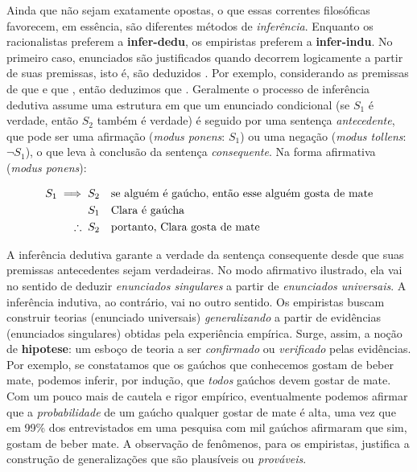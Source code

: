 \documentclass[./main.tex]{subfiles}
\begin{document}
\par Ainda que não sejam exatamente opostas, o que essas correntes filosóficas favorecem, em essência, são diferentes métodos de \textit{inferência}. Enquanto os racionalistas preferem a \textbf{\gls{infer-dedu}}, os empiristas preferem a \textbf{\gls{infer-indu}}. No primeiro caso, enunciados são justificados quando decorrem logicamente a partir de suas premissas, isto é, são deduzidos \cite{laird2010}. Por exemplo, considerando as premissas de que  e que , então deduzimos que . Geralmente o processo de inferência dedutiva assume uma estrutura em que um enunciado condicional (se $S_1$ é verdade, então $S_2$ também é verdade) é seguido por uma sentença \textit{antecedente}, que pode ser uma afirmação (\textit{modus ponens}: $S_1$) ou uma negação (\textit{modus tollens}: $\neg S_1$), o que leva à conclusão da sentença \textit{consequente}. Na forma afirmativa (\textit{modus ponens}):
\begin{linenomath*}
    \begin{align*}
        S_1 \implies S_2 & \quad \textnormal{se alguém é gaúcho, então esse alguém gosta de mate} \\
        S_1 & \quad \textnormal{Clara é gaúcha}\\
        \therefore\;S_2 & \quad \textnormal{portanto, Clara gosta de mate}
    \end{align*}
\end{linenomath*}
A inferência dedutiva garante a verdade da sentença consequente desde que suas premissas antecedentes sejam verdadeiras. No modo afirmativo ilustrado, ela vai no sentido de deduzir \textit{enunciados singulares} a partir de \textit{enunciados universais}. A inferência indutiva, ao contrário, vai no outro sentido. Os empiristas buscam construir teorias (enunciado universais) \textit{generalizando} a partir de evidências (enunciados singulares) obtidas pela experiência empírica. Surge, assim, a noção de \textbf{\gls{hipotese}}: um esboço de teoria a ser \textit{confirmado} ou \textit{verificado} pelas evidências. Por exemplo, se constatamos que os gaúchos que conhecemos gostam de beber mate, podemos inferir, por indução, que \textit{todos} gaúchos devem gostar de mate. Com um pouco mais de cautela e rigor empírico, eventualmente podemos afirmar que a \textit{probabilidade} de um gaúcho qualquer gostar de mate é alta, uma vez que em 99\% dos entrevistados em uma pesquisa com mil gaúchos afirmaram que sim, gostam de beber mate. A observação de fenômenos, para os empiristas, justifica a construção de generalizações que são plausíveis ou \textit{prováveis}.
\end{document}
